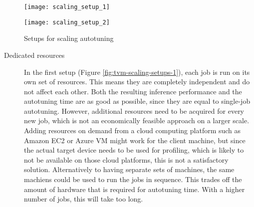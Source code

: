 \begin{figure}
	\begin{minipage}[b]{.45\textwidth}
		\centering\texttt{[image: scaling\_setup\_1]}
		\label{fig:tvm-scaling-setups-1}
	\end{minipage}%
	\hspace{2em}
	\begin{minipage}[b]{.45\textwidth}
		\centering\texttt{[image: scaling\_setup\_2]}
		\label{fig:tvm-scaling-setups-2}
	\end{minipage}
	\caption{Setups for scaling autotuning}
	\label{fig:tvm-scaling-setups}
\end{figure}

\begin{description}
	\item[Dedicated resources] In the first setup (Figure \ref{fig:tvm-scaling-setups-1}), each job is run on its own set of resources. This means they are completely independent and do not affect each other. Both the resulting inference performance and the autotuning time are as good as possible, since they are equal to single-job autotuning. However, additional resources need to be acquired for every new job, which is not an economically feasible approach on a larger scale. Adding resources on demand from a cloud computing platform such as Amazon EC2 or Azure VM might work for the client machine, but since the actual target device needs to be used for profiling, which is likely to not be available on those cloud platforms, this is not a satisfactory solution. Alternatively to having separate sets of machines, the same machiens could be used to run the jobs in sequence. This trades off the amount of hardware that is required for autotuning time. With a higher number of jobs, this will take too long.

\end{description}

